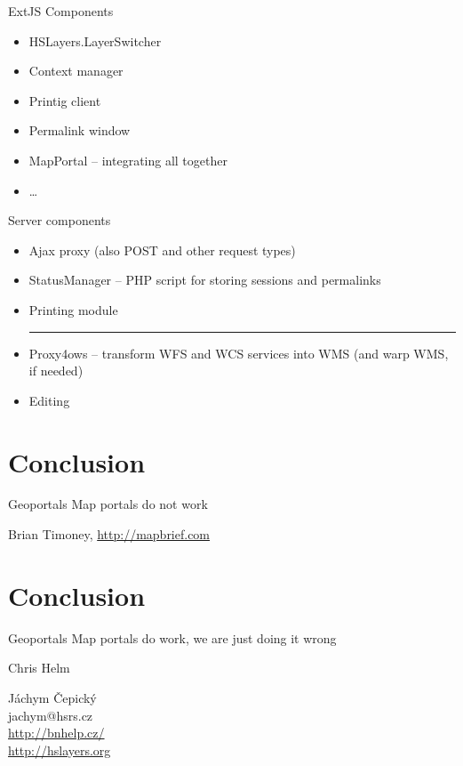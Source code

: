 \documentclass[xcolor=dvipsnames]{beamer}
\begin{document}
\begin{frame}{ExtJS Components}
\begin{itemize}
    \item HSLayers.LayerSwitcher
    \item Context manager
    \item Printig client
    \item Permalink window
    \item MapPortal -- integrating all together
    \item \dots
\end{itemize}
\end{frame}

\begin{frame}{Server components}
\begin{itemize}
    \item Ajax proxy (also POST and other request types)
    \item StatusManager -- PHP script for storing sessions and permalinks
    \item Printing module
    \hrule
    \item Proxy4ows -- transform WFS and WCS services into WMS (and warp WMS, if
    needed)
    \item Editing
\end{itemize}
\end{frame}

\section*{Conclusion}
\begin{frame}
\begin{block}{Geoportals}
Map portals do not work 
\end{block}
Brian Timoney, \url{http://mapbrief.com}
\end{frame}

\section*{Conclusion}
\begin{frame}
\begin{block}{Geoportals}
Map portals do work, we are just doing it wrong
\end{block}
Chris Helm
\end{frame}


\begin{frame}
    \begin{center}
        Jáchym Čepický \\
        jachym@hsrs.cz \\
        \url{http://bnhelp.cz/} \\
        \url{http://hslayers.org}
    \end{center}
\end{frame}
\end{document}
